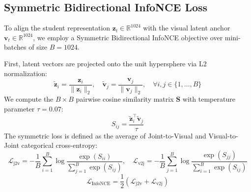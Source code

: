 \documentclass[11pt,a4paper]{article}
\begin{document}
\subsection{Symmetric Bidirectional InfoNCE Loss}
To align the student representation $\mathbf{z}_t \in \mathbb{R}^{1024}$ with the visual latent anchor $\mathbf{v}_t \in \mathbb{R}^{1024}$, we employ a Symmetric Bidirectional InfoNCE objective over mini-batches of size $B = 1024$.

First, latent vectors are projected onto the unit hypersphere via L2 normalization:
\begin{equation}
    \tilde{\mathbf{z}}_i = \frac{\mathbf{z}_i}{\|\mathbf{z}_i\|_2}, \quad \tilde{\mathbf{v}}_j = \frac{\mathbf{v}_j}{\|\mathbf{v}_j\|_2}, \quad \forall i, j \in \{1, \dots, B\}
\end{equation}
We compute the $B \times B$ pairwise cosine similarity matrix $\mathbf{S}$ with temperature parameter $\tau = 0.07$:
\begin{equation}
    S_{ij} = \frac{\tilde{\mathbf{z}}_i^\top \tilde{\mathbf{v}}_j}{\tau}
\end{equation}
The symmetric loss is defined as the average of Joint-to-Visual and Visual-to-Joint categorical cross-entropy:
\begin{equation}
    \mathcal{L}_{\text{j2v}} = -\frac{1}{B} \sum_{i=1}^B \log \frac{\exp(S_{ii})}{\sum_{j=1}^B \exp(S_{ij})}, \quad \mathcal{L}_{\text{v2j}} = -\frac{1}{B} \sum_{j=1}^B \log \frac{\exp(S_{jj})}{\sum_{i=1}^B \exp(S_{ij})}
\end{equation}
\begin{equation}
    \mathcal{L}_{\text{InfoNCE}} = \frac{1}{2} \left( \mathcal{L}_{\text{j2v}} + \mathcal{L}_{\text{v2j}} \right)
\end{equation}
\end{document}

